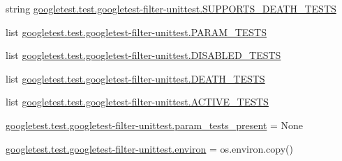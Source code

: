 \begin{DoxyCompactItemize}
\item 
string \mbox{\hyperlink{namespacegoogletest_1_1test_1_1googletest-filter-unittest_a42a1dc3f50e99fef9ecd79cf0809949c}{googletest.\+test.\+googletest-\/filter-\/unittest.\+S\+U\+P\+P\+O\+R\+T\+S\+\_\+\+D\+E\+A\+T\+H\+\_\+\+T\+E\+S\+TS}}
\item 
list \mbox{\hyperlink{namespacegoogletest_1_1test_1_1googletest-filter-unittest_a69696cd740070a1eb3f9c507861448bd}{googletest.\+test.\+googletest-\/filter-\/unittest.\+P\+A\+R\+A\+M\+\_\+\+T\+E\+S\+TS}}
\item 
list \mbox{\hyperlink{namespacegoogletest_1_1test_1_1googletest-filter-unittest_a98fa75f51b20bb5b8d680e6f1de569fe}{googletest.\+test.\+googletest-\/filter-\/unittest.\+D\+I\+S\+A\+B\+L\+E\+D\+\_\+\+T\+E\+S\+TS}}
\item 
list \mbox{\hyperlink{namespacegoogletest_1_1test_1_1googletest-filter-unittest_af28382c63f6e7c975abe64512bad9209}{googletest.\+test.\+googletest-\/filter-\/unittest.\+D\+E\+A\+T\+H\+\_\+\+T\+E\+S\+TS}}
\item 
list \mbox{\hyperlink{namespacegoogletest_1_1test_1_1googletest-filter-unittest_a8e4bb4e5c92ca7a573dfb28c2e9024a9}{googletest.\+test.\+googletest-\/filter-\/unittest.\+A\+C\+T\+I\+V\+E\+\_\+\+T\+E\+S\+TS}}
\item 
\mbox{\hyperlink{namespacegoogletest_1_1test_1_1googletest-filter-unittest_a78886b9c6292f80e51fdc319bd616300}{googletest.\+test.\+googletest-\/filter-\/unittest.\+param\+\_\+tests\+\_\+present}} = None
\item 
\mbox{\hyperlink{namespacegoogletest_1_1test_1_1googletest-filter-unittest_a8cacf6781d2473fb19b4d59fd60bba56}{googletest.\+test.\+googletest-\/filter-\/unittest.\+environ}} = os.\+environ.\+copy()
\end{DoxyCompactItemize}
